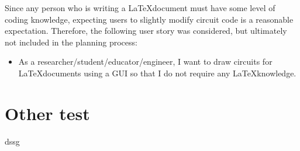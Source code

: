 Since any person who is writing a \LaTeX document must have some level of coding knowledge, expecting users to slightly modify circuit code is a reasonable expectation.
Therefore, the following user story was considered, but ultimately not included in the planning process:
\begin{itemize}
    \item {\color{red}As a researcher/student/educator/engineer, I want to draw circuits for \LaTeX documents using a GUI so that I do not require any \LaTeX knowledge.}
\end{itemize}

\section{Other test}
dssg
